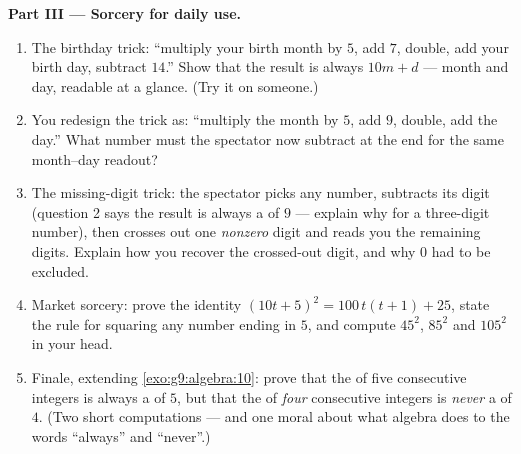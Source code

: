 \begin{problem}
\medskip
\noindent\textbf{Part III --- Sorcery for daily use.}
\begin{enumerate}[resume]
  \item The birthday trick: ``multiply your birth month by $5$,
        add $7$, double, add your birth day, subtract $14$.''
        Show that the result is always $10m + d$ --- month and
        day, readable at a glance. (Try it on someone.)
  \item You redesign the trick as: ``multiply the month by $5$,
        add $9$, double, add the day.'' What number must the
        spectator now subtract at the end for the same
        month--day readout?
  \item The missing-digit trick: the spectator picks any number,
        subtracts its digit  (question 2 says the result is
        always a  of $9$ --- explain why for a
        three-digit number), then crosses out one \emph{nonzero}
        digit and reads you the remaining digits. Explain how
        you recover the crossed-out digit, and why $0$ had to be
        excluded.
  \item Market sorcery: prove the identity
        $(10t + 5)^2 = 100\,t(t+1) + 25$, state the rule for
        squaring any number ending in $5$, and compute $45^2$,
        $85^2$ and $105^2$ in your head.
  \item Finale, extending \cref{exo:g9:algebra:10}: prove that
        the  of five consecutive integers is always a
         of $5$, but that the  of \emph{four}
        consecutive integers is \emph{never} a  of $4$.
        (Two short computations --- and one moral about what
        algebra does to the words ``always'' and ``never''.)
\end{enumerate}
\end{problem}
